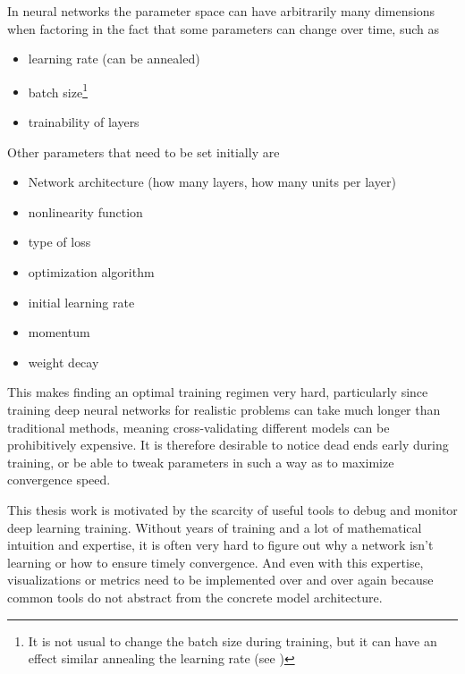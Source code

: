 In neural networks the parameter space can have arbitrarily many dimensions when factoring in the fact that some
parameters can change over time, such as

\begin{itemize}
    \item
        learning rate (can be annealed)
    \item
        batch size\footnote{It is not usual to change the batch size during
            training, but it can have an effect similar annealing the learning
        rate (see \cite{DBLP:journals/corr/abs-1711-00489})}
        \item
            trainability of layers
    \end{itemize}

    Other parameters that need to be set initially are

    \begin{itemize}
        \item
            Network architecture (how many layers, how many units per layer)
        \item
            nonlinearity function
        \item
            type of loss
        \item
            optimization algorithm
        \item
            initial learning rate
        \item
            momentum
        \item
            weight decay
    \end{itemize}

    This makes finding an optimal training regimen very hard, particularly
    since training deep neural networks for realistic problems can take much
    longer than traditional methods, meaning cross-validating different
    models can be prohibitively expensive. It is therefore desirable to
    notice dead ends early during training, or be able to tweak parameters
    in such a way as to maximize convergence speed.

    This thesis work is motivated by the scarcity of useful tools to debug
    and monitor deep learning training. Without years of training and a lot
    of mathematical intuition and expertise, it is often very hard to figure
    out why a network isn't learning or how to ensure timely convergence.
    And even with this expertise, visualizations or metrics need to be
    implemented over and over again because common tools do not abstract
    from the concrete model architecture.

